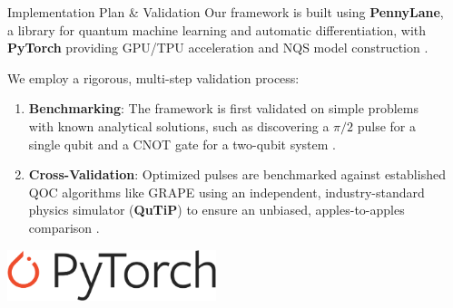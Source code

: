 \documentclass[final]{beamer}
\newlength{\sepwidth}
\newlength{\colwidth}
\newcommand{\separatorcolumn}{\begin{column}{\sepwidth}\end{column}}
\begin{document}
\begin{frame}[t]
\begin{columns}[t]
\begin{column}{\colwidth}
\begin{block}{Implementation Plan \& Validation}
    Our framework is built using \textbf{PennyLane}, a library for quantum machine learning and automatic differentiation, with \textbf{PyTorch} providing GPU/TPU acceleration and NQS model construction \cite{Bergholm2018, Paszke2019, Berni2025Brief}.
    
    We employ a rigorous, multi-step validation process:
    \begin{enumerate}
        \item \textbf{Benchmarking}: The framework is first validated on simple problems with known analytical solutions, such as discovering a $\pi/2$ pulse for a single qubit and a CNOT gate for a two-qubit system \cite{Berni2025Brief}.
        \item \textbf{Cross-Validation}: Optimized pulses are benchmarked against established QOC algorithms like GRAPE using an independent, industry-standard physics simulator (\textbf{QuTiP}) to ensure an unbiased, apples-to-apples comparison \cite{Johansson2012, Berni2025Brief}.
    \end{enumerate}
    \vspace{1em}
    \centering
    \includegraphics[height=1.5cm]{img/Pytorch_logo.png} \hspace{5em} 
     \hspace{5em}
     \hspace{5em}
\end{block}
\end{column}

\separatorcolumn
\end{columns}
\end{frame}
\end{document}
